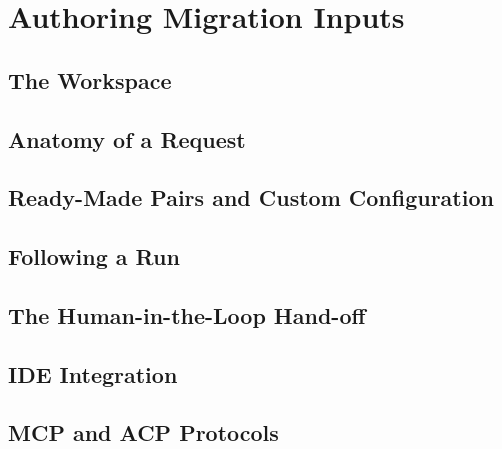 \chapter{Authoring Migration Inputs}
\label{chap:input}


\section{The Workspace}
\label{sec:input-workspace}


\section{Anatomy of a Request}
\label{sec:input-anatomy}


\section{Ready-Made Pairs and Custom Configuration}
\label{sec:input-readymade}


\section{Following a Run}
\label{sec:input-following}


\section{The Human-in-the-Loop Hand-off}
\label{sec:input-human}

\section{IDE Integration}
\label{sec:input-ide}

\section{MCP and ACP Protocols}
\label{sec:input-protocols}

